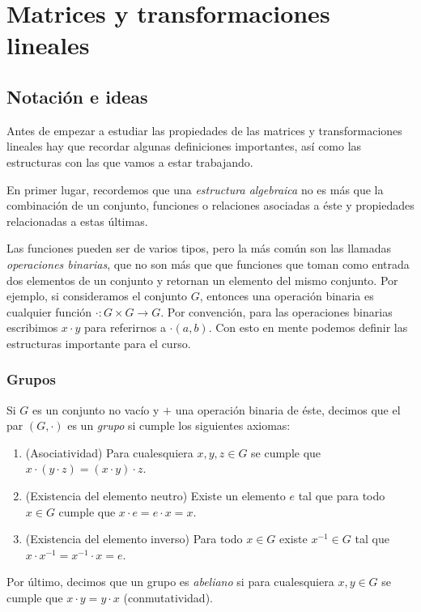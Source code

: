 \chapter{Matrices y transformaciones lineales}

\section{Notación e ideas}

Antes de empezar a estudiar las propiedades de las matrices y transformaciones lineales hay que recordar algunas definiciones importantes, así como las estructuras con las que vamos a estar trabajando.

En primer lugar, recordemos que una \emph{estructura algebraica} no es más que la combinación de un conjunto, funciones o relaciones asociadas a éste y propiedades relacionadas a estas últimas.

Las funciones pueden ser de varios tipos, pero la más común son las llamadas \emph{operaciones binarias}, que no son más que que funciones que toman como entrada dos elementos de un conjunto y retornan un elemento del mismo conjunto. Por ejemplo, si consideramos el conjunto $G$, entonces una operación binaria es cualquier función $\cdot \colon  G \times G \to G$. Por convención, para las operaciones binarias escribimos $x \cdot y$  para referirnos a $\cdot(a,b)$. Con esto en mente podemos definir las estructuras importante para el curso.


\subsection{Grupos}

\begin{defi}
  Si $G$ es un conjunto no vacío y $+$ una operación binaria de éste, decimos que el par $(G, \cdot)$ es un \emph{grupo} si cumple los siguientes axiomas:
  \begin{enumerate}
    \item (Asociatividad) Para cualesquiera $x, y, z \in G$ se cumple que $x\cdot(y\cdot z) = (x\cdot y)\cdot z$.
    \item (Existencia del elemento neutro) Existe un elemento $e$ tal que para todo $x \in G$ cumple que $x\cdot e = e\cdot x = x$.
    \item (Existencia del elemento inverso) Para todo $x \in G$ existe $x^{-1} \in G$ tal que $x\cdot x^{-1} = x^{-1}\cdot x = e$.
  \end{enumerate}
  Por último, decimos que un grupo es \emph{abeliano} si para cualesquiera $x,y \in G$ se cumple que $x\cdot y = y \cdot x$ (conmutatividad).
\end{defi}


